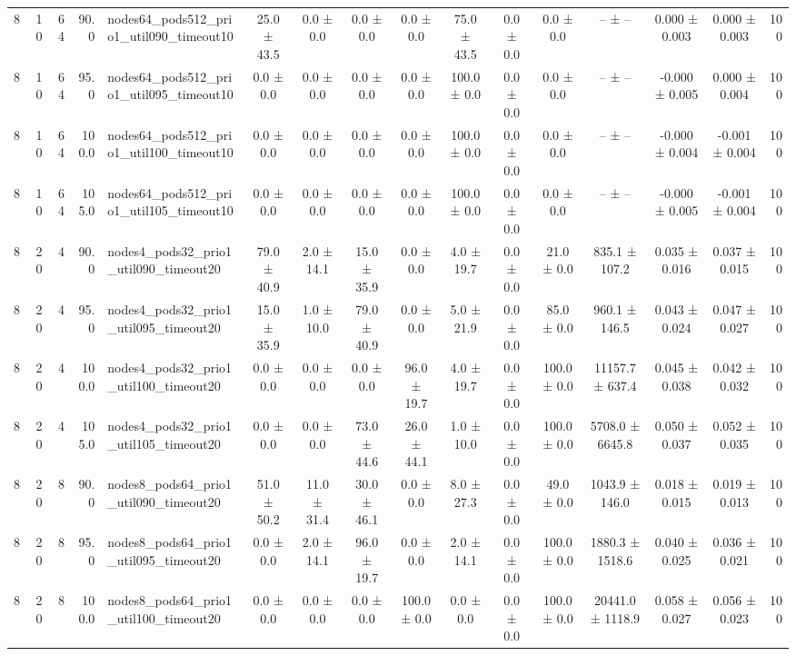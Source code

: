 \begin{tabular}{r r r r l c c c c c c c c c c r}
8 & 10 & 64 & 90.0 & nodes64\_pods512\_prio1\_util090\_timeout10 & 25.0 ± 43.5 & 0.0 ± 0.0 & 0.0 ± 0.0 & 0.0 ± 0.0 & 75.0 ± 43.5 & 0.0 ± 0.0 & 0.0 ± 0.0 & -- ± -- & 0.000 ± 0.003 & 0.000 ± 0.003 & 100 \\
8 & 10 & 64 & 95.0 & nodes64\_pods512\_prio1\_util095\_timeout10 & 0.0 ± 0.0 & 0.0 ± 0.0 & 0.0 ± 0.0 & 0.0 ± 0.0 & 100.0 ± 0.0 & 0.0 ± 0.0 & 0.0 ± 0.0 & -- ± -- & -0.000 ± 0.005 & 0.000 ± 0.004 & 100 \\
8 & 10 & 64 & 100.0 & nodes64\_pods512\_prio1\_util100\_timeout10 & 0.0 ± 0.0 & 0.0 ± 0.0 & 0.0 ± 0.0 & 0.0 ± 0.0 & 100.0 ± 0.0 & 0.0 ± 0.0 & 0.0 ± 0.0 & -- ± -- & -0.000 ± 0.004 & -0.001 ± 0.004 & 100 \\
8 & 10 & 64 & 105.0 & nodes64\_pods512\_prio1\_util105\_timeout10 & 0.0 ± 0.0 & 0.0 ± 0.0 & 0.0 ± 0.0 & 0.0 ± 0.0 & 100.0 ± 0.0 & 0.0 ± 0.0 & 0.0 ± 0.0 & -- ± -- & -0.000 ± 0.005 & -0.001 ± 0.004 & 100 \\
8 & 20 & 4 & 90.0 & nodes4\_pods32\_prio1\_util090\_timeout20 & 79.0 ± 40.9 & 2.0 ± 14.1 & 15.0 ± 35.9 & 0.0 ± 0.0 & 4.0 ± 19.7 & 0.0 ± 0.0 & 21.0 ± 0.0 & 835.1 ± 107.2 & 0.035 ± 0.016 & 0.037 ± 0.015 & 100 \\
8 & 20 & 4 & 95.0 & nodes4\_pods32\_prio1\_util095\_timeout20 & 15.0 ± 35.9 & 1.0 ± 10.0 & 79.0 ± 40.9 & 0.0 ± 0.0 & 5.0 ± 21.9 & 0.0 ± 0.0 & 85.0 ± 0.0 & 960.1 ± 146.5 & 0.043 ± 0.024 & 0.047 ± 0.027 & 100 \\
8 & 20 & 4 & 100.0 & nodes4\_pods32\_prio1\_util100\_timeout20 & 0.0 ± 0.0 & 0.0 ± 0.0 & 0.0 ± 0.0 & 96.0 ± 19.7 & 4.0 ± 19.7 & 0.0 ± 0.0 & 100.0 ± 0.0 & 11157.7 ± 637.4 & 0.045 ± 0.038 & 0.042 ± 0.032 & 100 \\
8 & 20 & 4 & 105.0 & nodes4\_pods32\_prio1\_util105\_timeout20 & 0.0 ± 0.0 & 0.0 ± 0.0 & 73.0 ± 44.6 & 26.0 ± 44.1 & 1.0 ± 10.0 & 0.0 ± 0.0 & 100.0 ± 0.0 & 5708.0 ± 6645.8 & 0.050 ± 0.037 & 0.052 ± 0.035 & 100 \\
8 & 20 & 8 & 90.0 & nodes8\_pods64\_prio1\_util090\_timeout20 & 51.0 ± 50.2 & 11.0 ± 31.4 & 30.0 ± 46.1 & 0.0 ± 0.0 & 8.0 ± 27.3 & 0.0 ± 0.0 & 49.0 ± 0.0 & 1043.9 ± 146.0 & 0.018 ± 0.015 & 0.019 ± 0.013 & 100 \\
8 & 20 & 8 & 95.0 & nodes8\_pods64\_prio1\_util095\_timeout20 & 0.0 ± 0.0 & 2.0 ± 14.1 & 96.0 ± 19.7 & 0.0 ± 0.0 & 2.0 ± 14.1 & 0.0 ± 0.0 & 100.0 ± 0.0 & 1880.3 ± 1518.6 & 0.040 ± 0.025 & 0.036 ± 0.021 & 100 \\
8 & 20 & 8 & 100.0 & nodes8\_pods64\_prio1\_util100\_timeout20 & 0.0 ± 0.0 & 0.0 ± 0.0 & 0.0 ± 0.0 & 100.0 ± 0.0 & 0.0 ± 0.0 & 0.0 ± 0.0 & 100.0 ± 0.0 & 20441.0 ± 1118.9 & 0.058 ± 0.027 & 0.056 ± 0.023 & 100 \\

\end{tabular}

